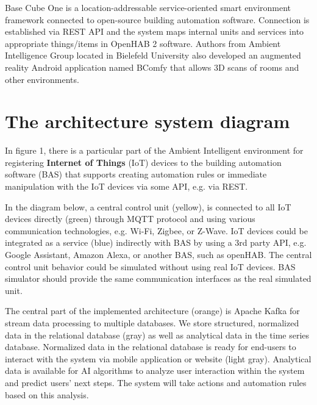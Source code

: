 \documentclass[fleqn,10pt]{olplainarticle}
\begin{document}
\vskip10pt

Base Cube One \cite{Pohling2019} is a location-addressable service-oriented smart environment framework connected to open-source building automation software. Connection is established via REST API and the system maps internal units and services into appropriate things/items in OpenHAB 2 software. Authors from Ambient Intelligence Group located in Bielefeld University also developed an augmented reality Android application named BComfy that allows 3D scans of rooms and other environments.

\section{The architecture system diagram}

In figure 1, there is a particular part of the Ambient Intelligent environment for registering \textbf{Internet of Things} (IoT) \cite{Atzori2010} devices to the building automation software (BAS) that supports creating automation rules or immediate manipulation with the IoT devices via some API, e.g. via REST.

\vskip10pt

In the diagram below, a central control unit (yellow), is connected to all IoT devices directly (green) through MQTT protocol and using various communication technologies, e.g. Wi-Fi, Zigbee, or Z-Wave. IoT devices could be integrated as a service (blue) indirectly with BAS by using a 3rd party API, e.g. Google Assistant, Amazon Alexa, or another BAS, such as openHAB. The central control unit behavior could be simulated without using real IoT devices. BAS simulator should provide the same communication interfaces as the real simulated unit.

\vskip10pt

The central part of the implemented architecture (orange) is Apache Kafka for stream data processing to multiple databases. We store structured, normalized data in the relational database (gray) as well as analytical data in the time series database. Normalized data in the relational database is ready for end-users to interact with the system via mobile application or website (light gray). Analytical data is available for AI algorithms to analyze user interaction within the system and predict users’ next steps. The system will take actions and automation rules based on this analysis.
\end{document}
